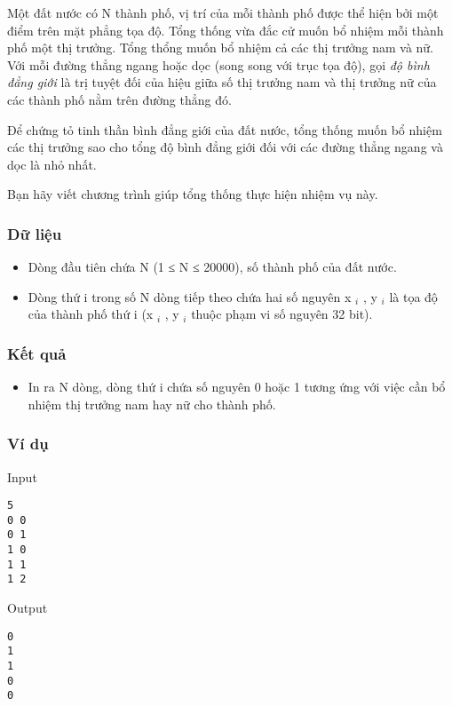 

Một đất nước có N thành phố, vị trí của mỗi thành phố được thể hiện bởi một điểm trên mặt phẳng tọa độ. Tổng thống vừa đắc cử muốn bổ nhiệm mỗi thành phố một thị trưởng. Tổng thổng muốn bổ nhiệm cả các thị trưởng nam và nữ. Với mỗi đường thẳng ngang hoặc dọc (song song với trục tọa độ), gọi \emph{ độ bình đẳng giới } là trị tuyệt đối của hiệu giữa số thị trưởng nam và thị trưởng nữ của các thành phố nằm trên đường thẳng đó.

Để chứng tỏ tinh thần bình đẳng giới của đất nước, tổng thống muốn bổ nhiệm các thị trưởng sao cho tổng độ bình đẳng giới đối với các đường thẳng ngang và dọc là nhỏ nhất.

Bạn hãy viết chương trình giúp tổng thống thực hiện nhiệm vụ này.

\subsubsection{Dữ liệu}
\begin{itemize}
	\item Dòng đầu tiên chứa N (1 ≤ N ≤ 20000), số thành phố của đất nước.
	\item Dòng thứ i trong số N dòng tiếp theo chứa hai số nguyên x $_ i $ , y $_ i $ là tọa độ của thành phố thứ i (x $_ i $ , y $_ i $ thuộc phạm vi số nguyên 32 bit).
\end{itemize}

\subsubsection{Kết quả}
\begin{itemize}
	\item In ra N dòng, dòng thứ i chứa số nguyên 0 hoặc 1 tương ứng với việc cần bổ nhiệm thị trưởng nam hay nữ cho thành phố.
\end{itemize}

\subsubsection{Ví dụ}

Input
\begin{verbatim}
5
0 0
0 1
1 0
1 1
1 2\end{verbatim}

Output
\begin{verbatim}
0
1
1
0
0\end{verbatim}